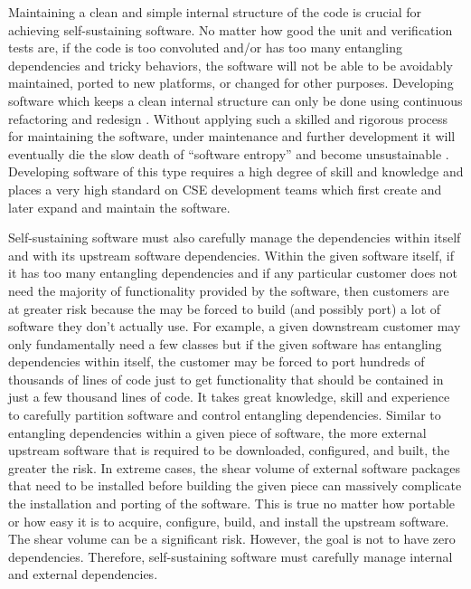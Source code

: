 \documentclass[11pt]{SANDreport}
\begin{document}
Maintaining a clean and simple internal structure of the code is
crucial for achieving self-sustaining software.  No matter how good
the unit and verification tests are, if the code is too convoluted
and/or has too many entangling dependencies and tricky behaviors, the
software will not be able to be avoidably maintained, ported to new
platforms, or changed for other purposes.  Developing software which
keeps a clean internal structure can only be done using continuous
refactoring and redesign {}\cite{XP2}.  Without applying such a
skilled and rigorous process for maintaining the software, under
maintenance and further development it will eventually die the slow
death of ``software entropy'' and become unsustainable
{}\cite{MythicalManMonth95}.  Developing software of this type
requires a high degree of skill and knowledge and places a very high
standard on CSE development teams which first create and later expand
and maintain the software.

Self-sustaining software must also carefully manage the dependencies
within itself and with its upstream software dependencies.  Within the
given software itself, if it has too many entangling dependencies and
if any particular customer does not need the majority of functionality
provided by the software, then customers are at greater risk because
the may be forced to build (and possibly port) a lot of software they
don't actually use.  For example, a given downstream customer may only
fundamentally need a few classes but if the given software has
entangling dependencies within itself, the customer may be forced to
port hundreds of thousands of lines of code just to get functionality
that should be contained in just a few thousand lines of code.  It
takes great knowledge, skill and experience to carefully partition
software and control entangling dependencies.  Similar to entangling
dependencies within a given piece of software, the more external
upstream software that is required to be downloaded, configured, and
built, the greater the risk.  In extreme cases, the shear volume of
external software packages that need to be installed before building
the given piece can massively complicate the installation and porting
of the software.  This is true no matter how portable or how easy it
is to acquire, configure, build, and install the upstream software.
The shear volume can be a significant risk.  However, the goal is not
to have zero dependencies.  Therefore, self-sustaining software must
carefully manage internal and external dependencies.
\end{document}
